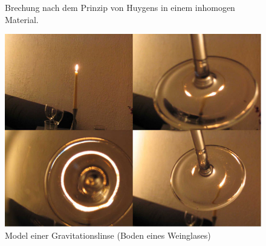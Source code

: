 \begin{refsection}
\begin{figure}
  \centering
  
  \caption{Brechung nach dem Prinzip von Huygens in einem inhomogen
    Material.}
  \label{fig:huygens3}
\end{figure}



\begin{figure}
  \centering
  \includegraphics[width=\textwidth]{cluster/images/model_grav_lens}
  \caption{Model einer Gravitationslinse (Boden eines Weinglases)
    \cite{standford:ModelGravLens}}
  \label{fig:ModelGravLinse}
\end{figure}

\printbibliography[heading=subbibliography]
\end{refsection}

